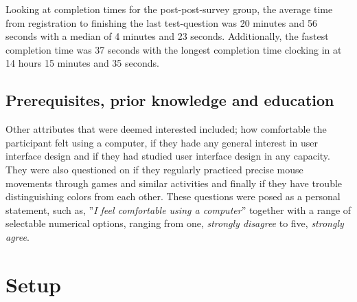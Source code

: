 \documentclass[nofilelist,dvipsnames]{cslthse-msc}
\begin{document}
{      Looking at completion times for the post-post-survey group, the average
      time from registration to finishing the last test-question was 20 minutes
      and 56 seconds with a median of 4 minutes and 23 seconds. Additionally,
      the fastest completion time was 37 seconds with the longest completion
      time clocking in at 14 hours 15 minutes and 35 seconds.

      \subsection{Prerequisites, prior knowledge and education}

      Other attributes that were deemed interested included; how comfortable
      the participant felt using a computer, if they hade any general interest
      in user interface design and if they had studied user interface design in
      any capacity. They were also questioned on if they regularly practiced
      precise mouse movements through games and similar activities and finally
      if they have trouble distinguishing colors from each other. These
      questions were posed as a personal statement, such as, ''\textit{I feel
        comfortable using a computer}'' together with a range of selectable
      numerical options, ranging from one, \textit{strongly disagree} to five,
      \textit{strongly agree}.

%
%



%
%
%
%
%
%
%

    \section{Setup}

}
\end{document}
